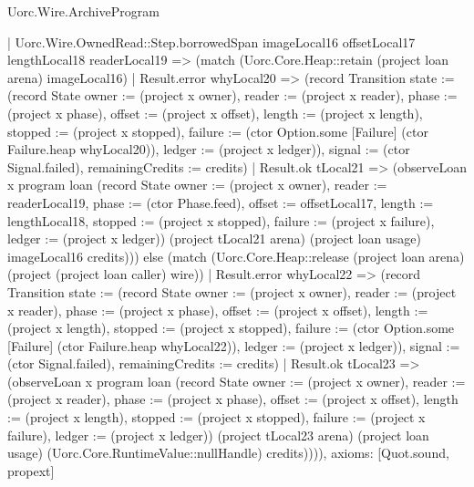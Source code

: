 \begin{lexlean}{Uorc.Wire.ArchiveProgram}
\begin{semanticmodule}
{    | Uorc.Wire.OwnedRead::Step.borrowedSpan imageLocal16 offsetLocal17 lengthLocal18 readerLocal19 => (match (Uorc.Core.Heap::retain (project loan arena) imageLocal16)
      | Result.error whyLocal20 => (record Transition {state := (record State {owner := (project x owner), reader := (project x reader), phase := (project x phase), offset := (project x offset), length := (project x length), stopped := (project x stopped), failure := (ctor Option.some [Failure] (ctor Failure.heap whyLocal20)), ledger := (project x ledger)}), signal := (ctor Signal.failed), remainingCredits := credits})
      | Result.ok tLocal21 => (observeLoan x program loan (record State {owner := (project x owner), reader := readerLocal19, phase := (ctor Phase.feed), offset := offsetLocal17, length := lengthLocal18, stopped := (project x stopped), failure := (project x failure), ledger := (project x ledger)}) (project tLocal21 arena) (project loan usage) imageLocal16 credits))) else (match (Uorc.Core.Heap::release (project loan arena) (project (project loan caller) wire))
    | Result.error whyLocal22 => (record Transition {state := (record State {owner := (project x owner), reader := (project x reader), phase := (project x phase), offset := (project x offset), length := (project x length), stopped := (project x stopped), failure := (ctor Option.some [Failure] (ctor Failure.heap whyLocal22)), ledger := (project x ledger)}), signal := (ctor Signal.failed), remainingCredits := credits})
    | Result.ok tLocal23 => (observeLoan x program loan (record State {owner := (project x owner), reader := (project x reader), phase := (project x phase), offset := (project x offset), length := (project x length), stopped := (project x stopped), failure := (project x failure), ledger := (project x ledger)}) (project tLocal23 arena) (project loan usage) (Uorc.Core.RuntimeValue::nullHandle) credits)))),
  axioms: [Quot.sound, propext]
}


\end{semanticmodule}
\end{lexlean}
